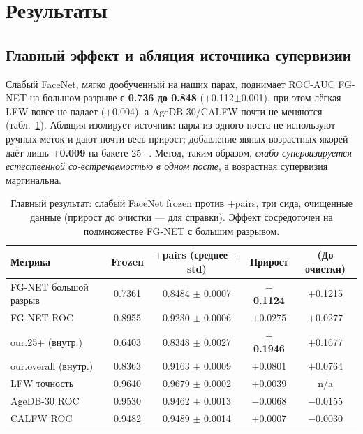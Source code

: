 \documentclass[10pt,twocolumn,letterpaper]{article}
\begin{document}
\section{Результаты}\label{sec:results}
\subsection{Главный эффект и абляция источника супервизии}\label{sec:res-main}
Слабый FaceNet, мягко дообученный на наших парах, поднимает ROC-AUC FG-NET на большом разрыве
\textbf{с 0.736 до 0.848} ($+$0.112$\pm$0.001), при этом лёгкая LFW вовсе не падает ($+$0.004), а AgeDB-30/CALFW почти не меняются (табл.~\ref{tab:main}). Абляция изолирует источник: пары из одного
поста не используют ручных меток и дают почти весь прирост; добавление явных возрастных якорей даёт лишь
\textbf{$+$0.009} на бакете 25+. Метод, таким образом, \emph{слабо супервизируется естественной
со-встречаемостью в одном посте}, а возрастная супервизия маргинальна.

\begin{table}[t]
\centering
\small
\begin{tabular}{@{}lcccc@{}}
\toprule
Метрика & Frozen & $+$pairs (среднее $\pm$ std) & Прирост & (До очистки) \\
\midrule
FG-NET большой разрыв & 0.7361 & 0.8484 $\pm$ 0.0007 & \textbf{$+$0.1124} & $+$0.1215 \\
FG-NET ROC & 0.8955 & 0.9230 $\pm$ 0.0006 & $+$0.0275 & $+$0.0277 \\
our.25+ (внутр.) & 0.6403 & 0.8348 $\pm$ 0.0027 & \textbf{$+$0.1946} & $+$0.1677 \\
our.overall (внутр.) & 0.8363 & 0.9163 $\pm$ 0.0009 & $+$0.0801 & $+$0.0764 \\
LFW точность & 0.9640 & 0.9679 $\pm$ 0.0002 & $+$0.0039 & n/a \\
AgeDB-30 ROC & 0.9530 & 0.9462 $\pm$ 0.0013 & $-$0.0068 & $-$0.0155 \\
CALFW ROC & 0.9482 & 0.9489 $\pm$ 0.0014 & $+$0.0007 & $-$0.0030 \\
\bottomrule
\end{tabular}
\caption{Главный результат: слабый FaceNet frozen против $+$pairs, три сида, очищенные данные (прирост
до очистки — для справки). Эффект сосредоточен на подмножестве FG-NET с большим разрывом.}
\label{tab:main}
\end{table}
\end{document}

